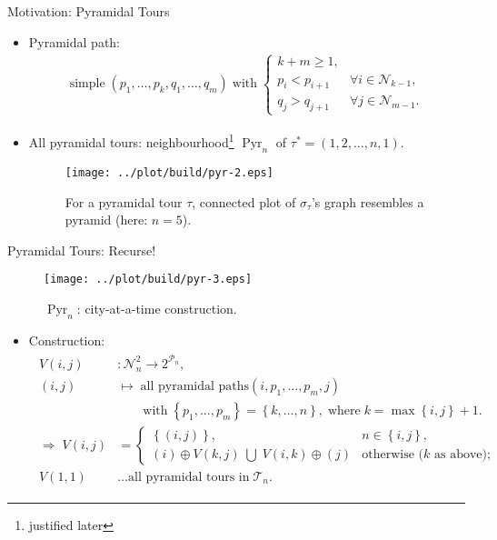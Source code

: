\documentclass[
  size=8pt,
  style=klope,
  paper=screen,
  mode=present,
  nohandoutpagebreaks,
  pauseslide,
  hlsections,
  fleqn,
]{powerdot}
\def\eqitspace{\vspace{-5mm}}
\begin{document}
\begin{slide}[toc=Pyramidal Tours]{Motivation: Pyramidal Tours}
\begin{itemize}
  \item
  Pyramidal path:
  \begin{align}
  \text{simple} \; \left( p_1, \ldots, p_k, q_1, \ldots, q_m \right) \; \text{with} \;
  \begin{cases}
  k+m \geq 1, & \\
  p_i < p_{i+1} \; & \forall i \in \mathcal{N}_{k-1},\\
  q_j > q_{j+1} \; & \forall j \in \mathcal{N}_{m-1}.
  \end{cases}
  \end{align}
  \item
  All pyramidal tours: neighbourhood\footnote{justified later} $\operatorname{Pyr}_n$ of
  $\tau^\ast = \left(1, 2, \ldots, n, 1\right)$.
  \begin{figure}[H]
    \centering
    \texttt{[image: ../plot/build/pyr-2.eps]}
    \caption{%
      For a pyramidal tour $\tau$,
      connected plot of $\sigma_\tau$'s
      graph resembles a pyramid (here: $n = 5$).
    }
  \end{figure}
\end{itemize}
\end{slide}

\begin{slide}[toc=]{Pyramidal Tours: Recurse!}
  \begin{figure}[H]
    \centering
    \texttt{[image: ../plot/build/pyr-3.eps]}
    \caption{$\operatorname{Pyr}_n$: city-at-a-time construction.}
  \end{figure}
\begin{itemize}
  \item
    Construction:
  \begin{align}
    \begin{split}
    V\left(i,j\right) & : \mathcal{N}_n^2 \to 2^{\mathcal{P}_n}, \\
    \left(i,j\right) & \mapsto \; \text{all pyramidal paths} \left(i,p_1,\ldots,p_m,j\right)
    \\
    & \qquad \text{with} \; \left\{ p_1,\ldots,p_m \right\} = \left\{ k,\ldots,n \right\},
    \; \text{where} \; k = \max\left\{i,j\right\}+1.
    \\
    \Rightarrow \;
    V\left(i,j\right) & =
    \begin{cases}
      \left\{\left(i,j\right)\right\}, & n \in \left\{i,j\right\},
      \\
      \left(i\right) \oplus V\left(k,j\right)
      \;\bigcup\;
      V\left(i,k\right) \oplus \left(j\right)
      & \text{otherwise ($k$ as above)};
    \end{cases}
    \\
    V\left(1,1\right) & \ldots \text{all pyramidal tours in} \; \mathcal{T}_n.
    \end{split}
  \end{align}
\end{itemize}
\end{slide}
\end{document}
